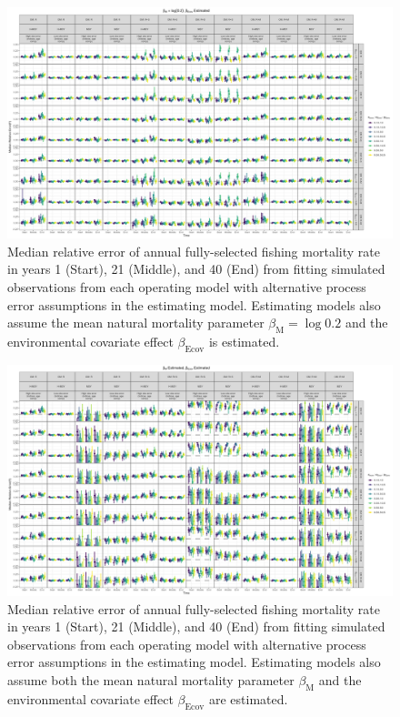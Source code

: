 \documentclass[
  12pt,
]{article}
\begin{document}
\begin{landscape}
\begin{figure}
\caption{Median relative error of annual fully-selected fishing mortality rate in years 1 (Start), 21 (Middle), and 40 (End) from fitting simulated observations from each operating model with alternative process error assumptions in the estimating model. Estimating models also assume the mean natural mortality parameter $\beta_\text{M} = \log 0.2$ and the environmental covariate effect $\beta_\text{Ecov}$ is estimated.}\label{F_bias_M_fixed_beta_estimated}
\begin{center}
\includegraphics[height = \textheight]{F_bias_all_PE_effect_M_fixed_beta_estimated.png}
\end{center}
\end{figure}
\end{landscape}

\begin{landscape}
\begin{figure}
\caption{Median relative error of annual fully-selected fishing mortality rate in years 1 (Start), 21 (Middle), and 40 (End) from fitting simulated observations from each operating model with alternative process error assumptions in the estimating model. Estimating models also assume both the mean natural mortality parameter $\beta_\text{M}$ and the environmental covariate effect $\beta_\text{Ecov}$ are estimated.}\label{F_bias_M_estimated_beta_estimated}
\begin{center}
\includegraphics[height = \textheight]{F_bias_all_PE_effect_M_estimated_beta_estimated.png}
\end{center}
\end{figure}
\end{landscape}
\end{document}
